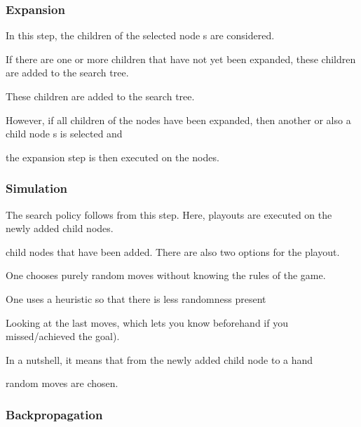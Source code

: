 \documentclass[bibliography=totoc]{scrartcl}
\begin{document}
\subsubsection{Expansion} 



In this step, the children of the selected node s are considered. 



If there are one or more children that have not yet been expanded, these children are added to the search tree.



These children are added to the search tree. 



However, if all children of the nodes have been expanded, then another or also a child node s is selected and



the expansion step is then executed on the nodes.







\subsubsection{Simulation} 



The search policy follows from this step. Here, playouts are executed on the newly added child nodes.



child nodes that have been added. There are also two options for the playout.



One chooses purely random moves without knowing the rules of the game.



One uses a heuristic so that there is less randomness present



Looking at the last moves, which lets you know beforehand if you missed/achieved the goal).



In a nutshell, it means that from the newly added child node to a hand



random moves are chosen.







\subsubsection{Backpropagation}
\end{document}
